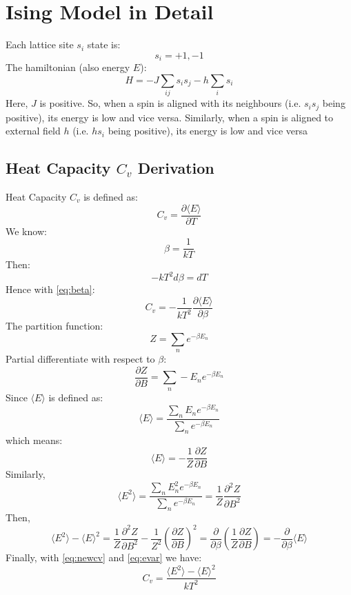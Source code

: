 \documentclass[a4paper]{article}
\numberwithin{equation}{section}
\begin{document}
\section{Ising Model in Detail}
Each lattice site $s_i$ state is:
$$s_i=+1,-1$$
The hamiltonian (also energy $E$):
$$H=-J\sum_{ij} s_i s_j-h\sum_{i}s_i$$
Here, $J$ is positive. So, when a spin is aligned with its neighbours (i.e. $s_is_j$ being positive), its energy is low and vice versa. Similarly, when a spin is aligned to external field $h$ (i.e. $hs_i$ being positive), its energy is low and vice versa
\subsection{Heat Capacity $C_v$ Derivation}
Heat Capacity $C_v$ is defined as:
$$C_v=\frac{\partial \langle E \rangle}{\partial T}$$
We know:
\begin{equation}\beta = \frac{1}{kT}\label{eq:beta}\end{equation}
Then:
$$-kT^2d\beta=dT$$
Hence with \ref{eq:beta}:
\begin{equation}C_v=-\frac{1}{kT^2}\frac{\partial \langle E \rangle}{\partial \beta}\label{eq:newcv}\end{equation}
The partition function:
$$Z=\sum_{n} e^{-\beta E_n}$$
Partial differentiate with respect to $\beta$:
$$\frac{\partial Z}{\partial B}=\sum_{n} -E_ne^{-\beta E_n}$$
Since $\langle E \rangle$ is defined as:
$$\langle E \rangle=\frac{\sum_{n} E_ne^{-\beta E_n}}{\sum_{n} e^{-\beta E_n}}$$
which means:
$$\langle E \rangle=-\frac{1}{Z}\frac{\partial Z}{\partial B}$$
Similarly, $$\langle E^2 \rangle=\frac{\sum_{n} E_n^2e^{-\beta E_n}}{\sum_{n} e^{-\beta E_n}}=\frac{1}{Z}\frac{\partial^2 Z}{\partial B^2}$$
Then,
\begin{equation}
\langle E^2 \rangle-\langle E \rangle^2=\frac{1}{Z}\frac{\partial^2 Z}{\partial B^2}-\frac{1}{Z^2}\left(\frac{\partial Z}{\partial B}\right)^2=\frac{\partial}{\partial \beta}\left( \frac{1}{Z}\frac{\partial Z}{\partial B}\right)=-\frac{\partial}{\partial \beta}\langle E \rangle\label{eq:evar}
\end{equation}
Finally, with \ref{eq:newcv} and \ref{eq:evar} we have:
$$C_v=\frac{\langle E^2 \rangle-\langle E \rangle^2}{kT^2}$$
\end{document}
